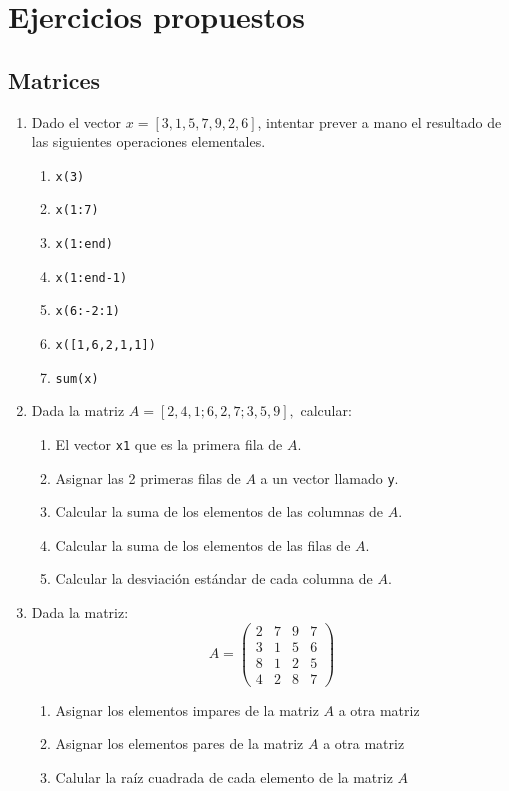 
\chapter{Ejercicios propuestos}


\section{Matrices}

\begin{enumerate}
\item Dado el vector $x=[3,1,5,7,9,2,6]$, intentar prever a mano el
  resultado de las siguientes operaciones elementales\@.

  \begin{enumerate}
  \item \texttt{x(3)}
  \item \texttt{x(1:7)}
  \item \texttt{x(1:end)}
  \item \texttt{x(1:end-1)}
  \item \texttt{x(6:-2:1)}
  \item \texttt{x({[}1,6,2,1,1{]})}
  \item \texttt{sum(x)}
  \end{enumerate}
\item Dada la matriz $A=[2,4,1;6,2,7;3,5,9],$ calcular:

  \begin{enumerate}
  \item El vector \texttt{x1} que es la primera fila de $A$.
  \item Asignar las 2 primeras filas de $A$ a un vector llamado
    \texttt{y}.
  \item Calcular la suma de los elementos de las columnas de $A$.
  \item Calcular la suma de los elementos de las filas de $A$.
  \item Calcular la desviación estándar de cada columna de $A$.
  \end{enumerate}
\item Dada la matriz:
$$A=\left(\begin{array}{cccc}
      2 & 7 & 9 & 7\\
      3 & 1 & 5 & 6\\
      8 & 1 & 2 & 5\\
      4 & 2 & 8 & 7\end{array}\right)$$


  \begin{enumerate}
  \item Asignar los elementos impares de la matriz $A$ a otra matriz
  \item Asignar los elementos pares de la matriz $A$ a otra matriz
  \item Calular la raíz cuadrada de cada elemento de la matriz $A$
  \end{enumerate}
\end{enumerate}

